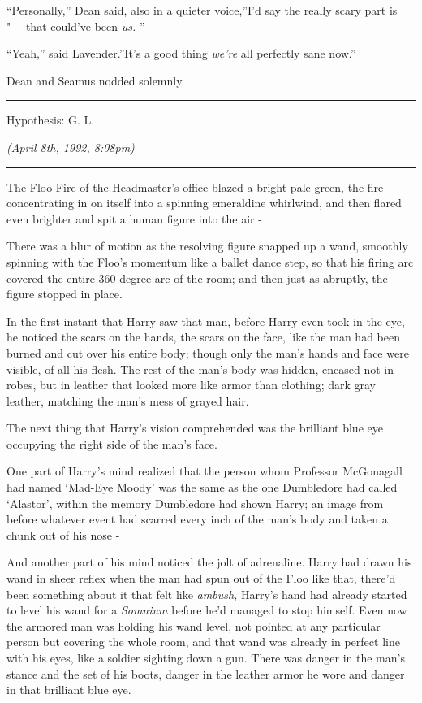 ``Personally,'' Dean said, also in a quieter voice,''I'd say the really
scary part is "--- that could've been \emph{us.} ''

``Yeah,'' said Lavender.''It's a good thing \emph{we're} all perfectly
sane now.''

Dean and Seamus nodded solemnly.

\begin{center}\rule{3in}{0.4pt}\end{center}

Hypothesis: G. L.

\emph{(April 8th, 1992, 8:08pm)}

\begin{center}\rule{3in}{0.4pt}\end{center}

The Floo-Fire of the Headmaster's office blazed a bright pale-green, the
fire concentrating in on itself into a spinning emeraldine whirlwind,
and then flared even brighter and spit a human figure into the air -

There was a blur of motion as the resolving figure snapped up a wand,
smoothly spinning with the Floo's momentum like a ballet dance step, so
that his firing arc covered the entire 360-degree arc of the room; and
then just as abruptly, the figure stopped in place.

In the first instant that Harry saw that man, before Harry even took in
the eye, he noticed the scars on the hands, the scars on the face, like
the man had been burned and cut over his entire body; though only the
man's hands and face were visible, of all his flesh. The rest of the
man's body was hidden, encased not in robes, but in leather that looked
more like armor than clothing; dark gray leather, matching the man's
mess of grayed hair.

The next thing that Harry's vision comprehended was the brilliant blue
eye occupying the right side of the man's face.

One part of Harry's mind realized that the person whom Professor
McGonagall had named `Mad-Eye Moody' was the same as the one Dumbledore
had called `Alastor', within the memory Dumbledore had shown Harry; an
image from before whatever event had scarred every inch of the man's
body and taken a chunk out of his nose -

And another part of his mind noticed the jolt of adrenaline. Harry had
drawn his wand in sheer reflex when the man had spun out of the Floo
like that, there'd been something about it that felt like \emph{ambush,}
Harry's hand had already started to level his wand for a \emph{Somnium}
before he'd managed to stop himself. Even now the armored man was
holding his wand level, not pointed at any particular person but
covering the whole room, and that wand was already in perfect line with
his eyes, like a soldier sighting down a gun. There was danger in the
man's stance and the set of his boots, danger in the leather armor he
wore and danger in that brilliant blue eye.

